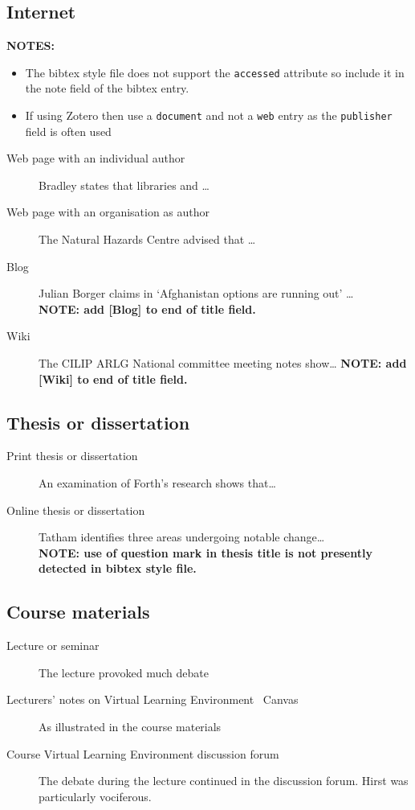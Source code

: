 \documentclass[12pt,oneside]{book} %
\begin{document}
\subsection{Internet}
\label{sec:Internet}
\textbf{NOTES:} 
\begin{itemize}
\item The bibtex style file does not support the \texttt{accessed} attribute so include it in the note field of the bibtex entry.
\item If using Zotero then use a \texttt{document} and not a \texttt{web} entry as the \texttt{publisher} field is often used
\end{itemize}
\begin{description}
\item[Web page with an individual author] Bradley \cite{bradley_notitle_2011} states that libraries and \ldots
\item[Web page with an organisation as author] The Natural Hazards Centre \cite{university_of_colorado_boulder_natural_2011} advised
that \ldots
\item[Blog] Julian Borger \cite{borger_afghanistan_2010} claims in `Afghanistan
options are running out' \ldots\\
\textbf{NOTE: add [Blog] to end of title field.}
\item[Wiki] The CILIP ARLG National committee
meeting notes show\ldots \cite{barefoot_october_2012}
\textbf{NOTE: add [Wiki] to end of title field.}
\end{description}

\subsection{Thesis or dissertation}
\label{sec:thesis}
\begin{description}
\item[Print thesis or dissertation] An examination of Forth’s \cite{forth_morphological_1989}
research shows that…
\item[Online thesis or dissertation] Tatham \cite{tatham_confidence_2010} identifies three areas
undergoing notable change…\\
\textbf{NOTE: use of question mark in thesis title is not presently detected in bibtex style file.}
\end{description}


\subsection{Course materials}
\label{sec:course}
\begin{description}
\item[Lecture or seminar] The lecture provoked much debate~\cite{johnson_peat_2012}
\item[Lecturers’ notes on Virtual Learning Environment \eg\ Canvas] As illustrated in the course materials~\cite{forth_analysis_2012}
\item[Course Virtual Learning Environment discussion forum] The debate during the lecture continued in the discussion forum. Hirst \cite{hurst_are_2012} was
particularly vociferous.
\end{description}
\end{document}
